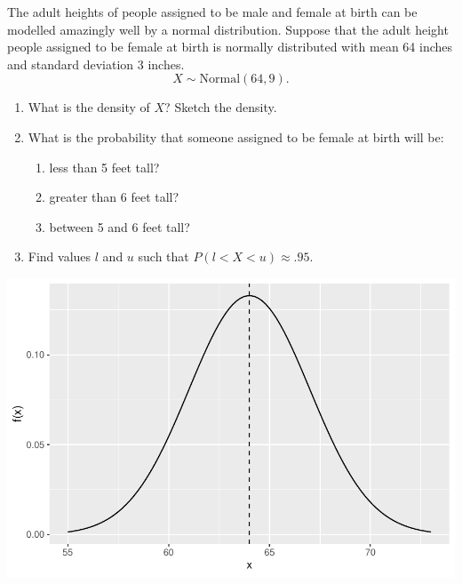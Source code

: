 \begin{frame}
  \begin{block}{\example}
    The adult heights of people assigned to be male and female at birth can be modelled amazingly well by a normal distribution. Suppose that the adult height people assigned to be female at birth is normally distributed with mean 64 inches and standard deviation 3 inches.
    \[
      X \sim \mbox{Normal}(64,9).
    \]
    
    \begin{enumerate}[label=\alph*),start=1]
    \item What is the density of $X$? Sketch the density.
    \item What is the probability that someone assigned to be female at birth will be:
      \begin{enumerate}[label=\roman*),start=1]
      \item less than 5 feet tall? 
      \item greater than 6 feet tall?
      \item between 5 and 6 feet tall?
      \end{enumerate}
    \item Find values $l$ and $u$ such that $P(l < X < u) \approx .95$. 
    \end{enumerate}
  \end{block}
\end{frame}




\begin{frame}

  \begin{block}{\examplectd}
  \begin{center}
    \includegraphics[height = .8\textheight]{figure/exercise-20-1}
  \end{center}
  \end{block}
  
\end{frame}

